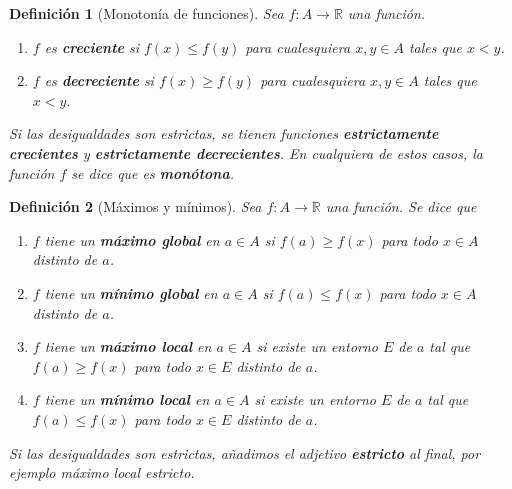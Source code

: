 \documentclass{article}
\newtheorem{define}{Definición}
\newcommand{\reales}{\mathbb{R}}
\begin{document}
\begin{define}[Monotonía de funciones]
	Sea $f:A \rightarrow \reales$ una función.
	\begin{enumerate}
		\item
		$f$ es \textbf{creciente} si $f(x) \leq f(y)$ para cualesquiera $x,y \in A$ tales que $x < y$.
		\item
		$f$ es \textbf{decreciente} si $f(x) \geq f(y)$ para cualesquiera $x,y \in A$ tales que $x < y$.
	\end{enumerate}
	Si las desigualdades son estrictas, se tienen funciones \textbf{estrictamente crecientes} y \textbf{estrictamente decrecientes}. En cualquiera de estos casos, la función $f$ se dice que es \textbf{monótona}.
\end{define}

\begin{define}[Máximos y mínimos]
	Sea $f:A \rightarrow \reales$ una función. Se dice que
	\begin{enumerate}
		\item
		$f$ tiene un \textbf{máximo global} en $a \in A$ si $f(a) \geq f(x)$ para todo $x \in A$ distinto de $a$.
		
		\item
		$f$ tiene un \textbf{mínimo global} en $a \in A$ si $f(a) \leq f(x)$ para todo $x \in A$ distinto de $a$.
			
		\item
		$f$ tiene un \textbf{máximo local} en $a \in A$ si existe un entorno $E$ de $a$ tal que $f(a) \geq f(x)$ para todo $x \in E$ distinto de $a$.
		
		\item
		$f$ tiene un \textbf{mínimo local} en $a \in A$ si existe un entorno $E$ de $a$ tal que $f(a) \leq f(x)$ para todo $x \in E$ distinto de $a$.
	\end{enumerate}
	Si las desigualdades son estrictas, añadimos el adjetivo \textbf{estricto} al final, por ejemplo máximo local estricto.
\end{define}
\end{document}
